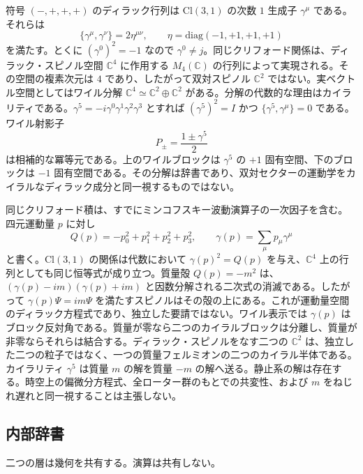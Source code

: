 \documentclass[a4paper]{article}
\theoremstyle{definition}
\begin{document}
符号 \((-,+,+,+)\) のディラック行列は \(\mathrm{Cl}(3,1)\) の次数 \(1\) 生成子 \(\gamma^\mu\) である。それらは
\[
\{\gamma^\mu,\gamma^\nu\}=2\eta^{\mu\nu},\qquad
\eta=\mathrm{diag}(-1,+1,+1,+1)
\]
を満たす。とくに \((\gamma^0)^2=-1\) なので \(\gamma^0\neq j\)。同じクリフォード関係は、ディラック・スピノル空間 \(\mathbb{C}^4\) に作用する \(M_4(\mathbb{C})\) の行列によって実現される。その空間の複素次元は \(4\) であり、したがって双対スピノル \(\mathbb{C}^2\) ではない。実ベクトル空間としてはワイル分解 \(\mathbb{C}^4\simeq\mathbb{C}^2\oplus\mathbb{C}^2\) がある。分解の代数的な理由はカイラリティである。\(\gamma^5=-i\gamma^0\gamma^1\gamma^2\gamma^3\) とすれば \((\gamma^5)^2=I\) かつ \(\{\gamma^5,\gamma^\mu\}=0\) である。ワイル射影子
\[
P_\pm=\frac{1\pm\gamma^5}{2}
\]
は相補的な冪等元である。上のワイルブロックは \(\gamma^5\) の \(+1\) 固有空間、下のブロックは \(-1\) 固有空間である。その分解は辞書であり、双対セクターの運動学をカイラルなディラック成分と同一視するものではない。

同じクリフォード積は、すでにミンコフスキー波動演算子の一次因子を含む。四元運動量 \(p\) に対し
\[
Q(p)=-p_0^2+p_1^2+p_2^2+p_3^2,\qquad
\gamma(p)=\sum_{\mu}p_\mu\gamma^\mu
\]
と書く。\(\mathrm{Cl}(3,1)\) の関係は代数において \(\gamma(p)^2=Q(p)\) を与え、\(\mathbb{C}^4\) 上の行列としても同じ恒等式が成り立つ。質量殻 \(Q(p)=-m^2\) は、\((\gamma(p)-im)(\gamma(p)+im)\) と因数分解される二次式の消滅である。したがって \(\gamma(p)\Psi=im\Psi\) を満たすスピノルはその殻の上にある。これが運動量空間のディラック方程式であり、独立した要請ではない。ワイル表示では \(\gamma(p)\) はブロック反対角である。質量が零なら二つのカイラルブロックは分離し、質量が非零ならそれらは結合する。ディラック・スピノルをなす二つの \(\mathbb{C}^2\) は、独立した二つの粒子ではなく、一つの質量フェルミオンの二つのカイラル半体である。カイラリティ \(\gamma^5\) は質量 \(m\) の解を質量 \(-m\) の解へ送る。静止系の解は存在する。時空上の偏微分方程式、全ローター群のもとでの共変性、および \(m\) をねじれ遅れと同一視することは主張しない。

\subsection{内部辞書}
\label{sec:dict}

二つの層は幾何を共有する。演算は共有しない。
\end{document}
